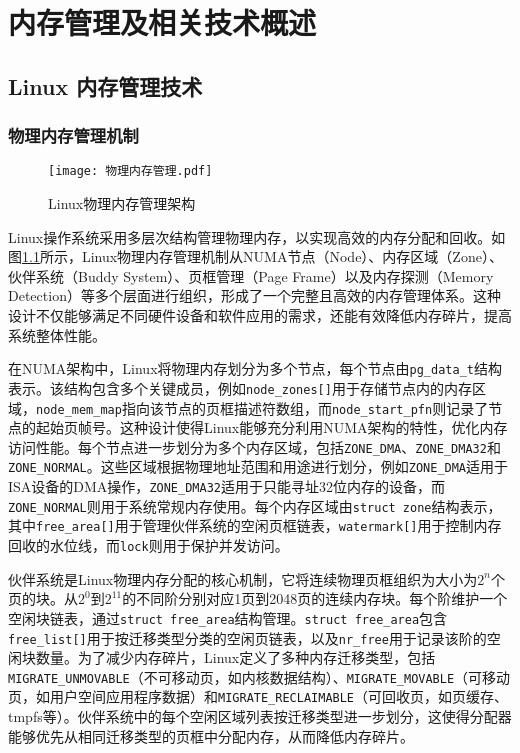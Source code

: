 \chapter{内存管理及相关技术概述}

\section{Linux 内存管理技术}

\subsection{物理内存管理机制}

\begin{figure}[h]
    \centering
    \texttt{[image: 物理内存管理.pdf]}
    \caption{Linux物理内存管理架构}
    \label{物理内存管理}
\end{figure}

Linux操作系统采用多层次结构管理物理内存，以实现高效的内存分配和回收。如图\ref{物理内存管理}所示，Linux物理内存管理机制从NUMA节点（Node）、内存区域（Zone）、伙伴系统（Buddy System）、页框管理（Page Frame）以及内存探测（Memory Detection）等多个层面进行组织，形成了一个完整且高效的内存管理体系。这种设计不仅能够满足不同硬件设备和软件应用的需求，还能有效降低内存碎片，提高系统整体性能。

在NUMA架构中，Linux将物理内存划分为多个节点，每个节点由\texttt{pg\_data\_t}结构表示。该结构包含多个关键成员，例如\texttt{node\_zones[]}用于存储节点内的内存区域，\texttt{node\_mem\_map}指向该节点的页框描述符数组，而\texttt{node\_start\_pfn}则记录了节点的起始页帧号。这种设计使得Linux能够充分利用NUMA架构的特性，优化内存访问性能。每个节点进一步划分为多个内存区域，包括\texttt{ZONE\_DMA}、\texttt{ZONE\_DMA32}和\texttt{ZONE\_NORMAL}。这些区域根据物理地址范围和用途进行划分，例如\texttt{ZONE\_DMA}适用于ISA设备的DMA操作，\texttt{ZONE\_DMA32}适用于只能寻址32位内存的设备，而\texttt{ZONE\_NORMAL}则用于系统常规内存使用。每个内存区域由\texttt{struct zone}结构表示，其中\texttt{free\_area[]}用于管理伙伴系统的空闲页框链表，\texttt{watermark[]}用于控制内存回收的水位线，而\texttt{lock}则用于保护并发访问。

伙伴系统是Linux物理内存分配的核心机制，它将连续物理页框组织为大小为$2^n$个页的块。从$2^0$到$2^{11}$的不同阶分别对应1页到2048页的连续内存块。每个阶维护一个空闲块链表，通过\texttt{struct free\_area}结构管理。\texttt{struct free\_area}包含\texttt{free\_list[]}用于按迁移类型分类的空闲页链表，以及\texttt{nr\_free}用于记录该阶的空闲块数量。为了减少内存碎片，Linux定义了多种内存迁移类型，包括\texttt{MIGRATE\_UNMOVABLE}（不可移动页，如内核数据结构）、\texttt{MIGRATE\_MOVABLE}（可移动页，如用户空间应用程序数据）和\texttt{MIGRATE\_RECLAIMABLE}（可回收页，如页缓存、tmpfs等）。伙伴系统中的每个空闲区域列表按迁移类型进一步划分，这使得分配器能够优先从相同迁移类型的页框中分配内存，从而降低内存碎片。


